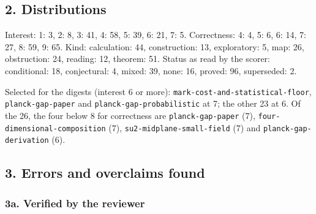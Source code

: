 \documentclass[11pt,a4paper]{article}
\begin{document}
\hypertarget{distributions}{%
\subsection{2. Distributions}\label{distributions}}

Interest: 1: 3, 2: 8, 3: 41, 4: 58, 5: 39, 6: 21, 7: 5. Correctness: 4:
4, 5: 6, 6: 14, 7: 27, 8: 59, 9: 65. Kind: calculation: 44,
construction: 13, exploratory: 5, map: 26, obstruction: 24, reading: 12,
theorem: 51. Status as read by the scorer: conditional: 18, conjectural:
4, mixed: 39, none: 16, proved: 96, superseded: 2.

Selected for the digests (interest 6 or more):
\texttt{mark-cost-and-statistical-floor}, \texttt{planck-gap-paper} and
\texttt{planck-gap-probabilistic} at 7; the other 23 at 6. Of the 26,
the four below 8 for correctness are \texttt{planck-gap-paper} (7),
\texttt{four-dimensional-composition} (7),
\texttt{su2-midplane-small-field} (7) and \texttt{planck-gap-derivation}
(6).

\hypertarget{errors-and-overclaims-found}{%
\subsection{3. Errors and overclaims
found}\label{errors-and-overclaims-found}}

\hypertarget{a.-verified-by-the-reviewer}{%
\subsubsection{3a. Verified by the
reviewer}\label{a.-verified-by-the-reviewer}}
\end{document}
